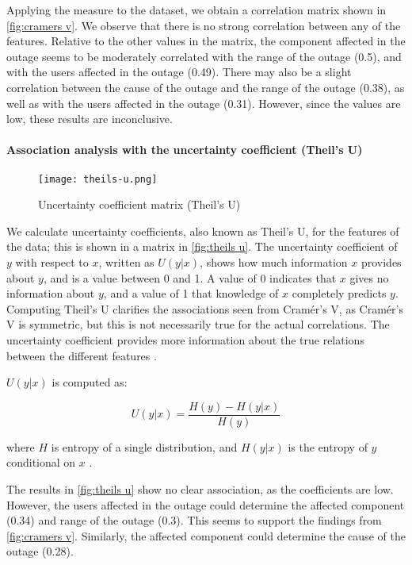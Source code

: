 Applying the measure to the dataset, we obtain a correlation matrix shown in \autoref{fig:cramers v}.
We observe that there is no strong correlation between any of the features.
Relative to the other values in the matrix, the component affected in the outage seems to be moderately correlated with the range of the outage (0.5), and with the users affected in the outage (0.49).
There may also be a slight correlation between the cause of the outage and the range of the outage (0.38), as well as with the users affected in the outage (0.31).
However, since the values are low, these results are inconclusive.

\paragraph{Association analysis with the uncertainty coefficient (Theil's U)}
\begin{figure}
  \centering
  \texttt{[image: theils-u.png]}
  \caption{Uncertainty coefficient matrix (Theil's U)}
  \label{fig:theils u}
\end{figure}

We calculate uncertainty coefficients, also known as Theil's U, for the features of the data; this is shown in a matrix in \autoref{fig:theils u}.
The uncertainty coefficient of $y$ with respect to $x$, written as $U(y|x)$, shows how much information $x$ provides about $y$, and is a value between 0 and 1.
A value of 0 indicates that $x$ gives no information about $y$, and a value of 1 that knowledge of $x$ completely predicts $y$.
Computing Theil's U clarifies the associations seen from Cram\'{e}r's V, as Cram\'{e}r's V is symmetric, but this is not necessarily true for the actual correlations.
The uncertainty coefficient provides more information about the true relations between the different features \cite{zychlinski2018}.

$U(y|x)$ is computed as:

$$
U(y|x) = \frac{H(y) - H(y|x)}{H(y)}
$$

where $H$ is entropy of a single distribution, and $H(y|x)$ is the entropy of $y$ conditional on $x$ \cite{press2007}.

The results in \autoref{fig:theils u} show no clear association, as the coefficients are low.
However, the users affected in the outage could determine the affected component (0.34) and range of the outage (0.3).
This seems to support the findings from \autoref{fig:cramers v}.
Similarly, the affected component could determine the cause of the outage (0.28).
